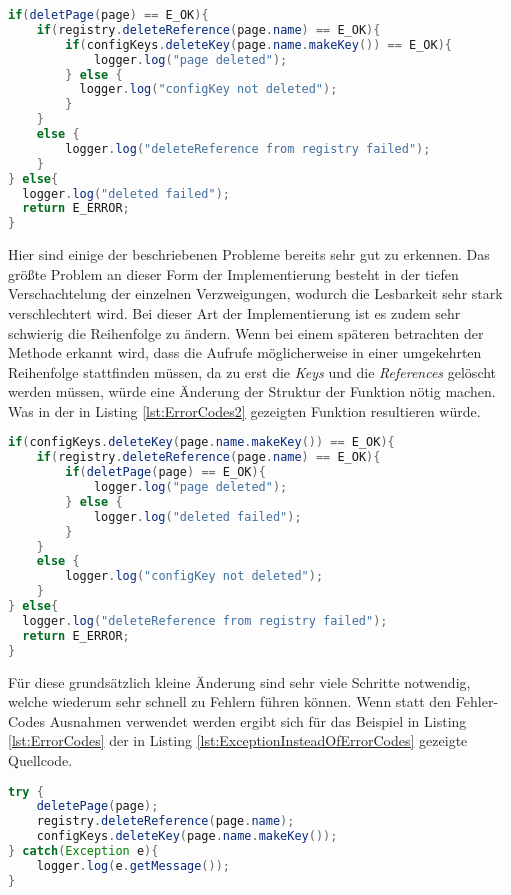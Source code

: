 \begin{lstlisting}[language={Java}, caption=Beispiele für die Verwendung von Fehler-Codes, label=lst:ErrorCodes]
if(deletPage(page) == E_OK){
    if(registry.deleteReference(page.name) == E_OK){
        if(configKeys.deleteKey(page.name.makeKey()) == E_OK){
            logger.log("page deleted");
        } else {
          logger.log("configKey not deleted");  
        }
    }
    else {
        logger.log("deleteReference from registry failed");
    }
} else{
  logger.log("deleted failed");
  return E_ERROR;
}
\end{lstlisting}

\SuperPar Hier sind einige der beschriebenen Probleme bereits sehr gut zu erkennen. Das größte Problem an dieser Form der Implementierung besteht in der tiefen Verschachtelung der einzelnen Verzweigungen, wodurch die Lesbarkeit sehr stark verschlechtert wird. Bei dieser Art der Implementierung ist es zudem sehr schwierig die Reihenfolge zu ändern. Wenn bei einem späteren betrachten der Methode erkannt wird, dass die Aufrufe möglicherweise in einer umgekehrten Reihenfolge stattfinden müssen, da zu erst die \textit{Keys} und die \textit{References} gelöscht werden müssen, würde eine Änderung der Struktur der Funktion nötig machen. Was in der in Listing \ref{lst:ErrorCodes2} gezeigten Funktion resultieren würde. 

\begin{lstlisting}[language={Java}, caption=Geänderte Reihenfolge der Funktion, label=lst:ErrorCodes2]
if(configKeys.deleteKey(page.name.makeKey()) == E_OK){
    if(registry.deleteReference(page.name) == E_OK){
        if(deletPage(page) == E_OK){
            logger.log("page deleted");           
        } else {
            logger.log("deleted failed");
        }
    }
    else {
        logger.log("configKey not deleted");  
    }
} else{
  logger.log("deleteReference from registry failed");
  return E_ERROR;
}
\end{lstlisting}

\SuperPar Für diese grundsätzlich kleine Änderung sind sehr viele Schritte notwendig, welche wiederum sehr schnell zu Fehlern führen können. Wenn statt den Fehler-Codes Ausnahmen verwendet werden ergibt sich für das Beispiel in Listing \ref{lst:ErrorCodes} der in Listing \ref{lst:ExceptionInsteadOfErrorCodes} gezeigte Quellcode.

\begin{lstlisting}[language={Java}, caption=Beispiele für die Verwendung von Ausnahmen statt Fehler-Codes, label=lst:ExceptionInsteadOfErrorCodes]
try {
    deletePage(page);
    registry.deleteReference(page.name);
    configKeys.deleteKey(page.name.makeKey());
} catch(Exception e){
    logger.log(e.getMessage());
}
\end{lstlisting}

